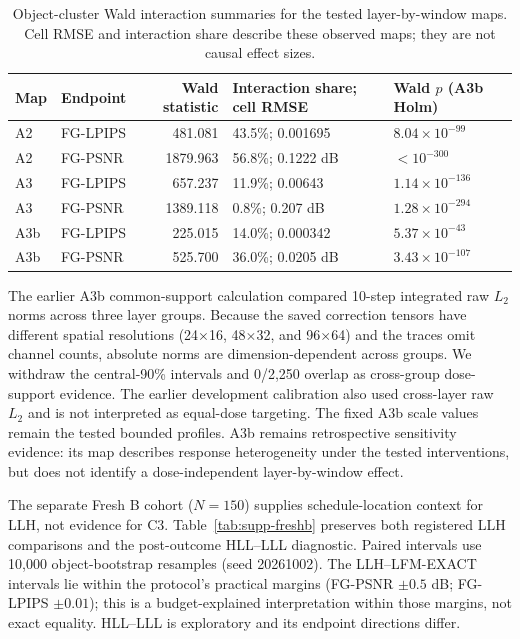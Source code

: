 \documentclass[11pt]{article}
\begin{document}
\begin{table}[ht]
\centering\small
\caption{Object-cluster Wald interaction summaries for the tested layer-by-window maps. Cell RMSE and interaction share describe these observed maps; they are not causal effect sizes.}\label{tab:supp-layerwindow}
\begin{tabular}{lp{2.1cm}rp{4.2cm}p{2.6cm}}\toprule Map & Endpoint & Wald statistic & Interaction share; cell RMSE & Wald $p$ (A3b Holm) \\\midrule
A2 & FG-LPIPS & 481.081 & 43.5\%; 0.001695 & $8.04\times10^{-99}$ \\
A2 & FG-PSNR & 1879.963 & 56.8\%; 0.1222 dB & $<10^{-300}$ \\
A3 & FG-LPIPS & 657.237 & 11.9\%; 0.00643 & $1.14\times10^{-136}$ \\
A3 & FG-PSNR & 1389.118 & 0.8\%; 0.207 dB & $1.28\times10^{-294}$ \\
A3b & FG-LPIPS & 225.015 & 14.0\%; 0.000342 & $5.37\times10^{-43}$ \\
A3b & FG-PSNR & 525.700 & 36.0\%; 0.0205 dB & $3.43\times10^{-107}$ \\
\bottomrule\end{tabular}
\end{table}

The earlier A3b common-support calculation compared 10-step integrated raw $L_2$ norms across three layer groups. Because the saved correction tensors have different spatial resolutions (24$\times$16, 48$\times$32, and 96$\times$64) and the traces omit channel counts, absolute norms are dimension-dependent across groups. We withdraw the central-90\% intervals and 0/2,250 overlap as cross-group dose-support evidence. The earlier development calibration also used cross-layer raw $L_2$ and is not interpreted as equal-dose targeting. The fixed A3b scale values remain the tested bounded profiles. A3b remains retrospective sensitivity evidence: its map describes response heterogeneity under the tested interventions, but does not identify a dose-independent layer-by-window effect.

The separate Fresh B cohort ($N=150$) supplies schedule-location context for LLH, not evidence for C3. Table~\ref{tab:supp-freshb} preserves both registered LLH comparisons and the post-outcome HLL--LLL diagnostic. Paired intervals use 10,000 object-bootstrap resamples (seed 20261002). The LLH--LFM-EXACT intervals lie within the protocol's practical margins (FG-PSNR $\pm0.5$ dB; FG-LPIPS $\pm0.01$); this is a budget-explained interpretation within those margins, not exact equality. HLL--LLL is exploratory and its endpoint directions differ.
\end{document}
